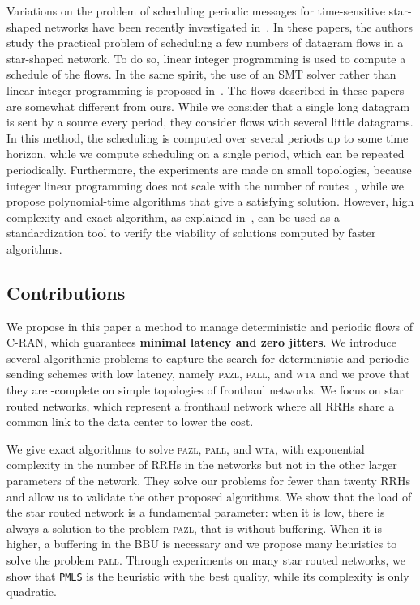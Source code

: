 \documentclass[a4paper,10pt]{journal}
\newcommand\PMLS{\texttt{PMLS}\xspace}
\newcommand\pazl{\textsc{pazl}\xspace}
\newcommand\pall{\textsc{pall}\xspace}
\newcommand\wta{\textsc{wta}\xspace}
\begin{document}
Variations on the problem of scheduling periodic messages for time-sensitive star-shaped networks have been recently investigated in~\cite{9472838,nayak2017incremental,steiner2018traffic,silviu2017,naresh2016}. In these papers, the authors study the practical problem of scheduling a few numbers of datagram flows in a star-shaped network. To do so, linear integer programming is used to compute a schedule of the flows. In the same spirit, the use of an SMT solver rather than linear integer programming is proposed in~\cite{dos2019tsnsched}. The flows described in these papers are somewhat different from ours. While we consider that a single long datagram is sent by a source every period, they consider flows with several little datagrams. In this method, the scheduling is computed over several periods up to some time horizon, while we compute scheduling on a single period, which can be repeated periodically. Furthermore, the experiments are made on small topologies, because integer linear programming does not scale with the number of routes~\cite{masoudi2020cost}, while we propose polynomial-time algorithms that give a satisfying solution. However, high complexity and exact algorithm, as explained in~\cite{steiner2018traffic}, can be used as a standardization tool to verify the viability of solutions computed by faster algorithms. 


\subsection*{Contributions}

We propose in this paper a method to manage deterministic and periodic flows of C-RAN, which guarantees \textbf{minimal latency and zero jitters}. We introduce several algorithmic problems to capture the search for deterministic and periodic sending schemes with low latency, namely \pazl, \pall, and \wta and we prove that they are \NP-complete on simple topologies of fronthaul networks. We focus on star routed networks, which represent a fronthaul network where all RRHs share a common link to the data center to lower the cost. 

We give exact algorithms to solve \pazl, \pall, and \wta, with exponential complexity in the number of RRHs in the networks
but not in the other larger parameters of the network. They solve our problems for fewer than twenty RRHs and allow us to validate the other proposed algorithms. 
We show that the load of the star routed network is a fundamental parameter: when it is low, there is always a solution to the problem
\pazl, that is without buffering. When it is higher, a buffering in the BBU is necessary and we propose many heuristics to solve the problem \pall. 
Through experiments on many star routed networks, we show that \PMLS is the heuristic with the best quality, while its complexity is only quadratic.
\end{document}
